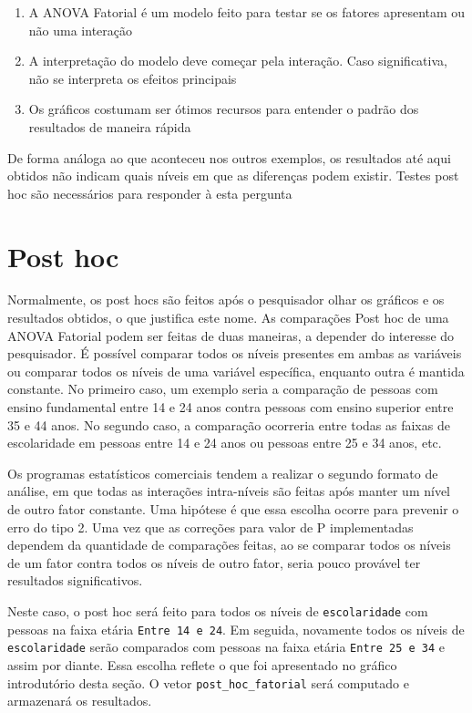 \documentclass[
]{book}
\providecommand{\tightlist}{%
  \setlength{\itemsep}{0pt}\setlength{\parskip}{0pt}}
\begin{document}
\begin{enumerate}
\def\labelenumi{\arabic{enumi}.}
\tightlist
\item
  A ANOVA Fatorial é um modelo feito para testar se os fatores apresentam ou não uma interação\\
\item
  A interpretação do modelo deve começar pela interação. Caso significativa, não se interpreta os efeitos principais\\
\item
  Os gráficos costumam ser ótimos recursos para entender o padrão dos resultados de maneira rápida\\
\end{enumerate}

De forma análoga ao que aconteceu nos outros exemplos, os resultados até aqui obtidos não indicam quais níveis em que as diferenças podem existir. Testes post hoc são necessários para responder à esta pergunta

\hypertarget{post-hoc-2}{%
\section{Post hoc}\label{post-hoc-2}}

Normalmente, os post hocs são feitos após o pesquisador olhar os gráficos e os resultados obtidos, o que justifica este nome. As comparações Post hoc de uma ANOVA Fatorial podem ser feitas de duas maneiras, a depender do interesse do pesquisador. É possível comparar todos os níveis presentes em ambas as variáveis ou comparar todos os níveis de uma variável específica, enquanto outra é mantida constante. No primeiro caso, um exemplo seria a comparação de pessoas com ensino fundamental entre 14 e 24 anos contra pessoas com ensino superior entre 35 e 44 anos. No segundo caso, a comparação ocorreria entre todas as faixas de escolaridade em pessoas entre 14 e 24 anos ou pessoas entre 25 e 34 anos, etc.

Os programas estatísticos comerciais tendem a realizar o segundo formato de análise, em que todas as interações intra-níveis são feitas após manter um nível de outro fator constante. Uma hipótese é que essa escolha ocorre para prevenir o erro do tipo 2. Uma vez que as correções para valor de P implementadas dependem da quantidade de comparações feitas, ao se comparar todos os níveis de um fator contra todos os níveis de outro fator, seria pouco provável ter resultados significativos.

Neste caso, o post hoc será feito para todos os níveis de \texttt{escolaridade} com pessoas na faixa etária \texttt{Entre\ 14\ e\ 24}. Em seguida, novamente todos os níveis de \texttt{escolaridade} serão comparados com pessoas na faixa etária \texttt{Entre\ 25\ e\ 34} e assim por diante. Essa escolha reflete o que foi apresentado no gráfico introdutório desta seção. O vetor \texttt{post\_hoc\_fatorial} será computado e armazenará os resultados.
\end{document}
